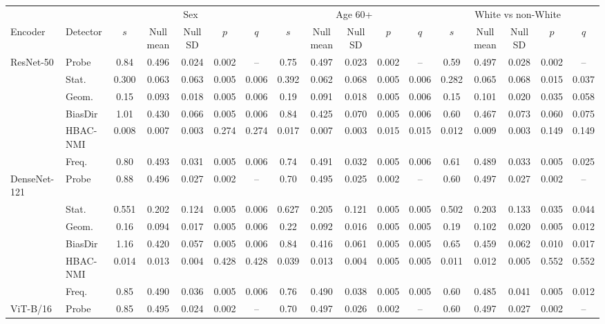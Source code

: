\begin{tabular}{llccccccccccccccc}
\toprule
 & & \multicolumn{5}{c}{Sex} & \multicolumn{5}{c}{Age 60+} & \multicolumn{5}{c}{White vs non-White} \\
\cmidrule(lr){3-7} \cmidrule(lr){8-12} \cmidrule(lr){13-17}
Encoder & Detector & $s$ & Null mean & Null SD & $p$ & $q$ & $s$ & Null mean & Null SD & $p$ & $q$ & $s$ & Null mean & Null SD & $p$ & $q$ \\
\midrule
ResNet-50 & Probe & 0.84 & 0.496 & 0.024 & 0.002 & -- & 0.75 & 0.497 & 0.023 & 0.002 & -- & 0.59 & 0.497 & 0.028 & 0.002 & -- \\
 & Stat. & 0.300 & 0.063 & 0.063 & 0.005 & 0.006 & 0.392 & 0.062 & 0.068 & 0.005 & 0.006 & 0.282 & 0.065 & 0.068 & 0.015 & 0.037 \\
 & Geom. & 0.15 & 0.093 & 0.018 & 0.005 & 0.006 & 0.19 & 0.091 & 0.018 & 0.005 & 0.006 & 0.15 & 0.101 & 0.020 & 0.035 & 0.058 \\
 & BiasDir & 1.01 & 0.430 & 0.066 & 0.005 & 0.006 & 0.84 & 0.425 & 0.070 & 0.005 & 0.006 & 0.60 & 0.467 & 0.073 & 0.060 & 0.075 \\
 & HBAC-NMI & 0.008 & 0.007 & 0.003 & 0.274 & 0.274 & 0.017 & 0.007 & 0.003 & 0.015 & 0.015 & 0.012 & 0.009 & 0.003 & 0.149 & 0.149 \\
 & Freq. & 0.80 & 0.493 & 0.031 & 0.005 & 0.006 & 0.74 & 0.491 & 0.032 & 0.005 & 0.006 & 0.61 & 0.489 & 0.033 & 0.005 & 0.025 \\
\midrule
DenseNet-121 & Probe & 0.88 & 0.496 & 0.027 & 0.002 & -- & 0.70 & 0.495 & 0.025 & 0.002 & -- & 0.60 & 0.497 & 0.027 & 0.002 & -- \\
 & Stat. & 0.551 & 0.202 & 0.124 & 0.005 & 0.006 & 0.627 & 0.205 & 0.121 & 0.005 & 0.005 & 0.502 & 0.203 & 0.133 & 0.035 & 0.044 \\
 & Geom. & 0.16 & 0.094 & 0.017 & 0.005 & 0.006 & 0.22 & 0.092 & 0.016 & 0.005 & 0.005 & 0.19 & 0.102 & 0.020 & 0.005 & 0.012 \\
 & BiasDir & 1.16 & 0.420 & 0.057 & 0.005 & 0.006 & 0.84 & 0.416 & 0.061 & 0.005 & 0.005 & 0.65 & 0.459 & 0.062 & 0.010 & 0.017 \\
 & HBAC-NMI & 0.014 & 0.013 & 0.004 & 0.428 & 0.428 & 0.039 & 0.013 & 0.004 & 0.005 & 0.005 & 0.011 & 0.012 & 0.005 & 0.552 & 0.552 \\
 & Freq. & 0.85 & 0.490 & 0.036 & 0.005 & 0.006 & 0.76 & 0.490 & 0.038 & 0.005 & 0.005 & 0.60 & 0.485 & 0.041 & 0.005 & 0.012 \\
\midrule
ViT-B/16 & Probe & 0.85 & 0.495 & 0.024 & 0.002 & -- & 0.70 & 0.497 & 0.026 & 0.002 & -- & 0.60 & 0.497 & 0.027 & 0.002 & -- \\

\end{tabular}
